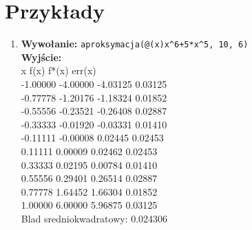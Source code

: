\documentclass[]{article}
\begin{document}
\section{Przykłady}
\begin{enumerate}
\item \textbf{Wywołanie:}
\verb|aproksymacja(@(x)x^6+5*x^5, 10, 6)|
\\\textbf{Wyjście:}\\
x\hspace{15mm}        f(x)\hspace{15mm}      f*(x)\hspace{13mm}     err(x)\\
-1.00000\hspace{5mm}  -4.00000\hspace{5mm}  -4.03125\hspace{5mm}   0.03125\\
-0.77778\hspace{5mm}  -1.20176\hspace{5mm}  -1.18324\hspace{5mm}   0.01852\\
-0.55556\hspace{5mm}  -0.23521\hspace{5mm}  -0.26408\hspace{5mm}   0.02887\\
-0.33333\hspace{5mm}  -0.01920\hspace{5mm}  -0.03331\hspace{5mm}   0.01410\\
-0.11111\hspace{5mm}  -0.00008\hspace{5mm}   0.02445\hspace{5mm}   0.02453\\
0.11111\hspace{5mm}   0.00009\hspace{6mm}   0.02462\hspace{7mm}   0.02453\\
0.33333\hspace{5mm}   0.02195\hspace{6mm}   0.00784\hspace{7mm}   0.01410\\
0.55556\hspace{5mm}   0.29401\hspace{6mm}   0.26514\hspace{7mm}   0.02887\\
0.77778\hspace{5mm}   1.64452\hspace{6mm}   1.66304\hspace{7mm}   0.01852\\
1.00000\hspace{5mm}   6.00000\hspace{6mm}   5.96875\hspace{7mm}   0.03125\\
Blad sredniokwadratowy: 0.024306


\end{enumerate}
\end{document}

